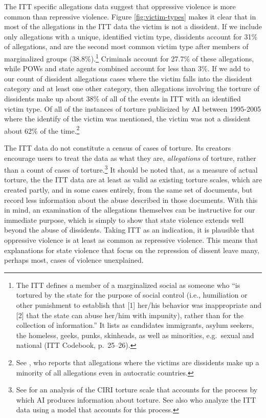 \documentclass[11pt]{article}
\begin{document}
The ITT specific allegations data suggest that oppressive violence is more common than repressive violence. Figure \ref{fig:victim-types} makes it clear that in most of the allegations in the ITT data the victim is not a dissident. If we include only allegations with a unique, identified victim type, dissidents account for 31\% of allegations, and are the second most common victim type after members of marginalized groups (38.8\%).\footnote{The ITT defines a member of a marginalized social as someone who ``is tortured by the state for the purpose of social control (i.e., humiliation or other punishment to establish that [1] her/his behavior was inappropriate and [2] that the state can abuse her/him with impunity), rather than for the collection of information.'' It lists as candidates immigrants, asylum seekers, the homeless, geeks, punks, skinheads, as well as minorities, e.g.\ sexual and national (ITT Codebook, p.\ 25--26).} Criminals account for 27.7\% of these allegations, while POWs and state agents combined account for less than 3\%. If we add to our count of dissident allegations cases where the victim falls into the dissident category and at least one other category, then allegations involving the torture of dissidents make up about 38\% of all of the events in ITT with an identified victim type. Of all of the instances of torture publicized by AI between 1995-2005 where the identify of the victim was mentioned, the victim was not a dissident about 62\% of the time.\footnote{See \citet[][pp.\ 3-4]{Haschke2018}, who reports that allegations where the victims are dissidents make up a minority of all allegations even in autocratic countries.} 

The ITT data do not constitute a census of cases of torture. Its creators encourage users to treat the data as what they are, {\em allegations} of torture, rather than a count of cases of torture.\footnote{See \citet{HillMooreMukherjee2013} for an analysis of the CIRI torture scale that accounts for the process by which AI produces information about torture. See also \citet{ConradHillMoore} who analyze the ITT data using a model that accounts for this process.} It should be noted that, as a measure of actual torture, the the ITT data are at least as valid as existing torture scales, which are created partly, and in some cases entirely, from the same set of documents, but record less information about the abuse described in those documents. With this in mind, an examination of the allegations themselves can be instructive for our immediate purpose, which is simply to show that state violence extends well beyond the abuse of dissidents. Taking ITT as an indication, it is plausible that oppressive violence is at least as common as repressive violence. This means that explanations for state violence that focus on the repression of dissent leave many, perhaps most, cases of violence unexplained. 
\end{document}
